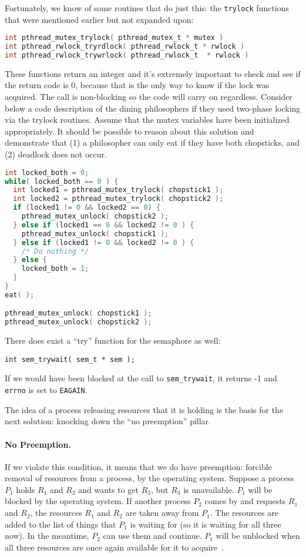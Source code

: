 Fortunately, we know of some routines that do just this: the \texttt{trylock} functions that were mentioned earlier but not expanded upon:
\begin{lstlisting}[language=C]
int pthread_mutex_trylock( pthread_mutex_t * mutex )
int pthread_rwlock_tryrdlock( pthread_rwlock_t * rwlock )
int pthread_rwlock_trywrlock( pthread_rwlock_t  * rwlock )
\end{lstlisting}

These functions return an integer and it's extremely important to check and see if the return code is 0, because that is the only way to know if the lock was acquired. The call is non-blocking so the code will carry on regardless. Consider below a code description of the dining philosophers if they used two-phase locking via the trylock routines. Assume that the mutex variables have been initialized appropriately. It should be possible to reason about this solution and demonstrate that (1) a philosopher can only eat if they have both chopsticks, and (2) deadlock does not occur.

\begin{lstlisting}[language=C]
int locked_both = 0;
while( locked_both == 0 ) {
  int locked1 = pthread_mutex_trylock( chopstick1 );
  int locked2 = pthread_mutex_trylock( chopstick2 );
  if (locked1 != 0 && locked2 == 0) {
    pthread_mutex_unlock( chopstick2 );
  } else if (locked1 == 0 && locked2 != 0 ) {
    pthread_mutex_unlock( chopstick1 );
  } else if (locked1 != 0 && locked2 != 0 ) {
    /* Do nothing */
  } else {
    locked_both = 1;
  }
}
eat( );

pthread_mutex_unlock( chopstick1 );
pthread_mutex_unlock( chopstick2 );
\end{lstlisting}

There does exist a ``try'' function for the semaphore as well:

\begin{lstlisting}
int sem_trywait( sem_t * sem );
\end{lstlisting}

If we would have been blocked at the call to \texttt{sem\_trywait}, it returns -1 and \texttt{errno} is set to \texttt{EAGAIN}.

The idea of a process releasing resources that it is holding is the basis for the next solution: knocking down the ``no preemption'' pillar.


\paragraph{No Preemption.} If we violate this condition, it means that we do have preemption: forcible removal of resources from a process, by the operating system. Suppose a process $P_{1}$ holds $R_{1}$ and $R_{2}$ and wants to get $R_{3}$, but $R_{3}$ is unavailable. $P_{1}$ will be blocked by the operating system. If another process $P_{2}$ comes by and requests $R_{1}$ and $R_{2}$, the resources $R_{1}$ and $R_{2}$ are taken away from $P_{1}$. The resources are added to the list of things that $P_{1}$ is waiting for (so it is waiting for all three now). In the meantime, $P_{2}$ can use them and continue. $P_{1}$ will be unblocked when all three resources are once again available for it to acquire~\cite{osc}.

